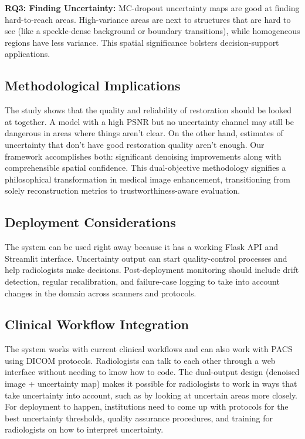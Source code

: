\documentclass[conference]{IEEEtran}
\begin{document}
\textbf{RQ3: Finding Uncertainty:} MC-dropout uncertainty maps are good at finding hard-to-reach areas. High-variance areas are next to structures that are hard to see (like a speckle-dense background or boundary transitions), while homogeneous regions have less variance. This spatial significance bolsters decision-support applications.

\subsection{Methodological Implications}
The study shows that the quality and reliability of restoration should be looked at together. A model with a high PSNR but no uncertainty channel may still be dangerous in areas where things aren't clear. On the other hand, estimates of uncertainty that don't have good restoration quality aren't enough. Our framework accomplishes both: significant denoising improvements along with comprehensible spatial confidence. This dual-objective methodology signifies a philosophical transformation in medical image enhancement, transitioning from solely reconstruction metrics to trustworthiness-aware evaluation.

\subsection{Deployment Considerations}
The system can be used right away because it has a working Flask API and Streamlit interface. Uncertainty output can start quality-control processes and help radiologists make decisions. Post-deployment monitoring should include drift detection, regular recalibration, and failure-case logging to take into account changes in the domain across scanners and protocols.

\subsection{Clinical Workflow Integration}
The system works with current clinical workflows and can also work with PACS using DICOM protocols. Radiologists can talk to each other through a web interface without needing to know how to code. The dual-output design (denoised image + uncertainty map) makes it possible for radiologists to work in ways that take uncertainty into account, such as by looking at uncertain areas more closely. For deployment to happen, institutions need to come up with protocols for the best uncertainty thresholds, quality assurance procedures, and training for radiologists on how to interpret uncertainty.
\end{document}
